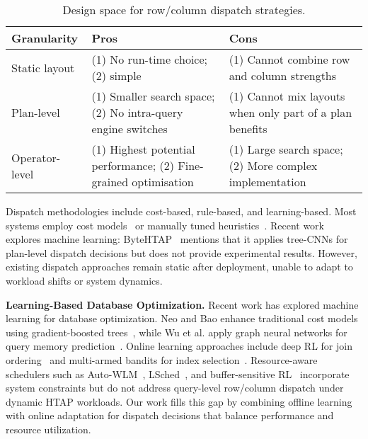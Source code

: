 \documentclass[sigconf, nonacm]{acmart}
\begin{document}
\begin{table}[t]
  \caption{Design space for row/column dispatch strategies.}
  \label{tab:design-space}
  \small
  \setlength{\tabcolsep}{3pt}
  \renewcommand{\arraystretch}{1.2}
  \renewcommand{\tabularxcolumn}[1]{m{#1}}  %

  \begin{tabularx}{\columnwidth}{@{} 
  >{\raggedright\arraybackslash\hsize=0.9\hsize}X 
  >{\raggedright\arraybackslash\hsize=1.1\hsize}X 
  >{\raggedright\arraybackslash\hsize=1\hsize}X @{}}
    \toprule
    \textbf{Granularity} &
    \qquad \textbf{Pros} &
    \qquad \textbf{Cons}\\
    \midrule
    Static layout~\cite{raman2013db2} &
      (1) No run-time choice; (2) simple &
      (1) Cannot combine row and column strengths \\[2pt]
    Plan-level~\cite{oracle2025heatwave} &
      (1) Smaller search space; (2) No intra-query engine switches &
      (1) Cannot mix layouts when only part of a plan benefits \\[2pt]
    Operator-level~\cite{larson2015real,lahiri2015oracle,huang2020tidb,wang2023polardb,farber2012sap_acm} &
      (1) Highest potential performance; (2) Fine-grained optimisation &
      (1) Large search space; (2) More complex implementation \\
    \bottomrule
  \end{tabularx}
  \vspace{-1em}
\end{table}

Dispatch methodologies include cost-based, rule-based, and learning\hspace{0pt}-based.
Most systems employ cost models~\cite{wang2023polardb,larson2015real} or manually tuned heuristics~\cite{farber2012sap_acm}. 
Recent work explores machine learning: ByteHTAP~\cite{chen2022bytehtap} mentions that it applies tree-CNNs for plan-level dispatch decisions but does not provide experimental results. 
However, existing dispatch approaches remain static after deployment, unable to adapt to workload shifts or system dynamics.

\noindent\textbf{Learning-Based Database Optimization.}
Recent work has explored machine learning for database optimization. Neo and Bao enhance traditional cost models using gradient-boosted trees~\cite{marcus2019neo,marcus2021bao}, while Wu et al. apply graph neural networks for query memory prediction~\cite{wu2025memq}. Online learning approaches include deep RL for join ordering~\cite{krishnan2018learning} and multi-armed bandits for index selection~\cite{perera2021dba,wu2024automatic}. Resource-aware schedulers such as Auto-WLM~\cite{saxena2023auto}, LSched~\cite{sabek2022lsched}, and buffer-sensitive RL~\cite{zhang2020buffer} incorporate system constraints but do not address query-level row/column dispatch under dynamic HTAP workloads. Our work fills this gap by combining offline learning with online adaptation for dispatch decisions that balance performance and resource utilization.
\end{document}
